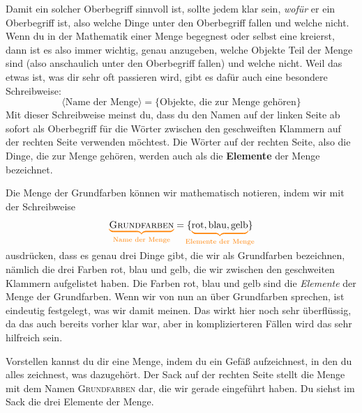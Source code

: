 \documentclass[../../main.tex]{subfiles}
\begin{document}
Damit ein solcher Oberbegriff sinnvoll ist, sollte jedem klar sein, \emph{wofür} er ein Oberbegriff ist, also welche Dinge unter den Oberbegriff fallen und welche nicht. Wenn du in der Mathematik einer Menge begegnest oder selbst eine kreierst, dann ist es also immer wichtig, genau anzugeben, welche Objekte Teil der Menge sind (also anschaulich unter den Oberbegriff fallen) und welche nicht. Weil das etwas ist, was dir sehr oft passieren wird, gibt es dafür auch eine besondere Schreibweise:
\[\langle\text{Name der Menge}\rangle=\{\text{Objekte, die zur Menge gehören}\}\]
Mit dieser Schreibweise meinst du, dass du den Namen auf der linken Seite ab sofort als Oberbegriff für die Wörter zwischen den geschweiften Klammern auf der rechten Seite verwenden möchtest. Die Wörter auf der rechten Seite, also die Dinge, die zur Menge gehören, werden auch als die \textbf{Elemente} der Menge bezeichnet.

\begin{example}{}

    Die Menge der Grundfarben können wir mathematisch notieren, indem wir mit der Schreibweise
    \[\colorbrace{\textsc{Grundfarben}}{\text{Name der Menge}}=\{\colorbrace{\text{rot},\text{blau},\text{gelb}}{\text{Elemente der Menge}}\}\]
    ausdrücken, dass es genau drei Dinge gibt, die wir als Grundfarben bezeichnen, nämlich die drei Farben rot, blau und gelb, die wir zwischen den geschweiten Klammern aufgelistet haben. Die Farben rot, blau und gelb sind die \emph{Elemente} der Menge der Grundfarben. Wenn wir von nun an über Grundfarben sprechen, ist eindeutig festgelegt, was wir damit meinen. Das wirkt hier noch sehr überflüssig, da das auch bereits vorher klar war, aber in komplizierteren Fällen wird das sehr hilfreich sein.

    Vorstellen kannst du dir eine Menge, indem du ein Gefäß aufzeichnest, in den du alles zeichnest, was dazugehört. Der Sack auf der rechten Seite stellt die Menge mit dem Namen \textsc{Grundfarben} dar, die wir gerade eingeführt haben. Du siehst im Sack die drei Elemente der Menge.
\end{example}
\end{document}
